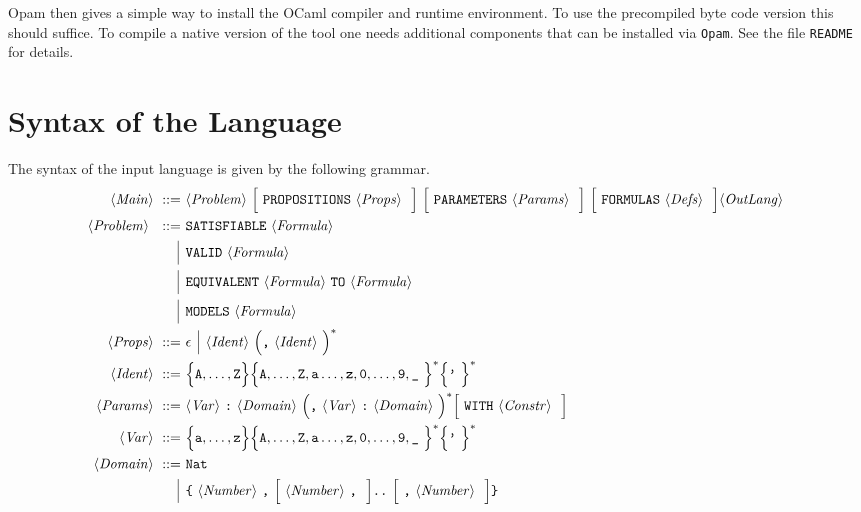 \documentclass[twoside]{article}
\begin{document}
Opam then gives a simple way to install the OCaml compiler and runtime environment. To use the precompiled byte code version this should suffice. To compile a native 
version of the \DiMo tool one needs additional components that can be installed via \texttt{Opam}. See the file \texttt{README} for details.

\section{Syntax of the \DiMo Language}

The syntax of the \DiMo input language is given by the following grammar.
\begin{align*}
\nonterm{Main} ::=\ & \nonterm{Problem} \optional{\term{PROPOSITIONS} \nonterm{Props}}\ 
                                         \optional{\term{PARAMETERS} \nonterm{Params}}\ 
                                         \optional{\term{FORMULAS} \nonterm{Defs}}  \nonterm{OutLang}\\
\nonterm{Problem}\ ::=\ & \term{SATISFIABLE} \nonterm{Formula} \\
                 \altn & \term{VALID} \nonterm{Formula} \\
                 \altn & \term{EQUIVALENT} \nonterm{Formula} \term{TO} \nonterm{Formula} \\
                 \altn & \term{MODELS} \nonterm{Formula} \\
\nonterm{Props} ::=\ & \epsilon \altn \nonterm{Ident} \Big(\term{,} \nonterm{Ident}\Big)^* \\
\nonterm{Ident} ::=\ & \enumset{\texttt{A},\ldots,\texttt{Z}}\enumset{\texttt{A},\ldots,\texttt{Z},\texttt{a}\ldots,\texttt{z},\texttt{0},\ldots,\texttt{9},\term{\_}}^*\enumset{\term{'}}^* \\
\nonterm{Params} ::=\ & \nonterm{Var} \term{:} \nonterm{Domain} \Big( \term{,} \nonterm{Var} \term{:} \nonterm{Domain} \Big)^* 
                           \optional{\term{WITH} \nonterm{Constr}} \\
\nonterm{Var} ::=\ & \enumset{\texttt{a},\ldots,\texttt{z}}\enumset{\texttt{A},\ldots,\texttt{Z},\texttt{a}\ldots,\texttt{z},\texttt{0},\ldots,\texttt{9},\term{\_}}^*\enumset{\term{'}}^* \\ 
\nonterm{Domain} ::=\ & \term{Nat} \\
                \altn & \term{\{} \nonterm{Number} \term{,} \optional{\nonterm{Number} \term{,}} \term{..} 
                                         \optional{\term{,} \nonterm{Number}} \term{\}} \\

\end{align*}
\end{document}

